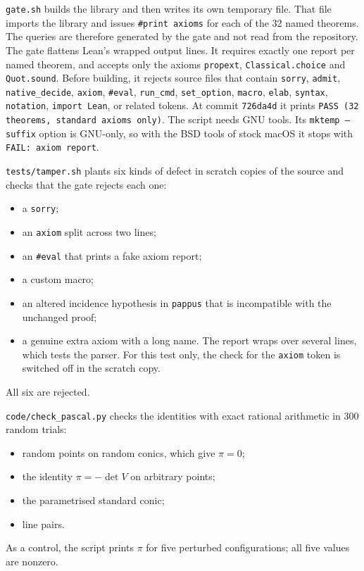\documentclass[11pt]{article}
\theoremstyle{remark}
\newcommand{\lean}[1]{\texttt{#1}}
\newcommand{\commit}{726da4d}
\begin{document}
\texttt{gate.sh} builds the library and then writes its own temporary file. That file imports the
library and issues \lean{\#print axioms} for each of the 32 named theorems. The queries are
therefore generated by the gate and not read from the repository. The gate flattens Lean's wrapped
output lines. It requires exactly one report per named theorem, and accepts only the axioms
\lean{propext}, \lean{Classical.choice} and \lean{Quot.sound}. Before building, it rejects source
files that contain \lean{sorry}, \lean{admit}, \lean{native\_decide}, \lean{axiom}, \lean{\#eval},
\lean{run\_cmd}, \lean{set\_option}, \lean{macro}, \lean{elab}, \lean{syntax}, \lean{notation},
\lean{import Lean}, or related tokens. At commit \texttt{\commit} it prints
\texttt{PASS (32 theorems, standard axioms only)}. The script needs GNU tools. Its \texttt{mktemp
--suffix} option is GNU-only, so with the BSD tools of stock macOS it stops with
\texttt{FAIL: axiom report}.

\texttt{tests/tamper.sh} plants six kinds of defect in scratch copies of the source and checks that
the gate rejects each one:
\begin{itemize}
\item a \lean{sorry};
\item an \lean{axiom} split across two lines;
\item an \lean{\#eval} that prints a fake axiom report;
\item a custom macro;
\item an altered incidence hypothesis in \lean{pappus} that is incompatible with the unchanged
proof;
\item a genuine extra axiom with a long name. The report wraps over several lines, which tests
the parser. For this test only, the check for the \lean{axiom} token is switched off in the scratch copy.
\end{itemize}
All six are rejected.

\texttt{code/check\_pascal.py} checks the identities with exact rational arithmetic in 300 random
trials:
\begin{itemize}
\item random points on random conics, which give $\pi=0$;
\item the identity $\pi=-\det V$ on arbitrary points;
\item the parametrised standard conic;
\item line pairs.
\end{itemize}
As a control, the script prints $\pi$ for five perturbed configurations; all five values are nonzero.
\end{document}
